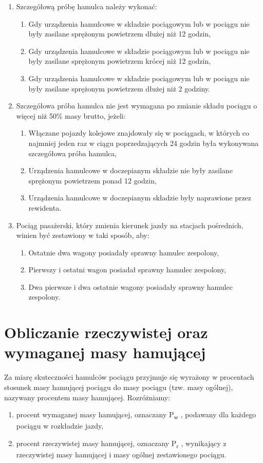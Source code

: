 \begin{tcolorbox}[colback=black!5!white,colframe=white!55!black,title=Sprawdźmy się]
	\begin{enumerate}
		\item Szczegółową próbę hamulca należy wykonać:
		\begin{enumerate}
			\item Gdy urządzenia hamulcowe w składzie pociągowym lub w pociągu nie były zasilane sprężonym powietrzem dłużej niż 12 godzin,
			\item Gdy urządzenia hamulcowe w składzie pociągowym lub w pociągu nie były zasilane sprężonym powietrzem krócej niż 12 godzin,
			\item Gdy urządzenia hamulcowe w składzie pociągowym lub w pociągu nie były zasilane sprężonym powietrzem dłużej niż 2 godziny.
		\end{enumerate}
		\item Szczegółowa próba hamulca nie jest wymagana po zmianie składu pociągu o więcej niż 50\% masy brutto, jeżeli:
		\begin{enumerate}
			\item Włączane pojazdy kolejowe znajdowały się w pociągach, w których co najmniej jeden raz w ciągu poprzedzających 24 godzin była wykonywana szczegółowa próba hamulca,
			\item Urządzenia hamulcowe w doczepianym składzie nie były zasilane sprężonym  powietrzem ponad 12 godzin,
			\item Urządzenia hamulcowe w doczepianym składzie były naprawione przez rewidenta.
		\end{enumerate}
		\item Pociąg pasażerski, który zmienia kierunek jazdy na stacjach pośrednich,  winien    być zestawiony w taki sposób, aby:
		\begin{enumerate}
			\item Ostatnie dwa wagony posiadały sprawny hamulec zespolony, 
			\item Pierwszy i ostatni wagon posiadał sprawny hamulec zespolony,
			\item Dwa pierwsze i dwa ostatnie wagony posiadały sprawny hamulec zespolony.
		\end{enumerate}
	\end{enumerate}
\end{tcolorbox}

\chapter{Obliczanie rzeczywistej oraz wymaganej masy hamującej}
Za miarę skuteczności hamulców pociągu przyjmuje się wyrażony w procentach stosunek masy hamującej pociągu do masy pociągu (tzw. masy ogólnej),
nazywany procentem masy hamującej. Rozróżniamy:
\begin{enumerate}
	\item procent wymaganej masy hamującej, oznaczany P\textsubscript{w} , podawany dla każdego pociągu w rozkładzie jazdy,
	\item procent rzeczywistej masy hamującej, oznaczany P\textsubscript{r} , wynikający z rzeczywistej masy hamującej i masy ogólnej zestawionego pociągu.
\end{enumerate}

